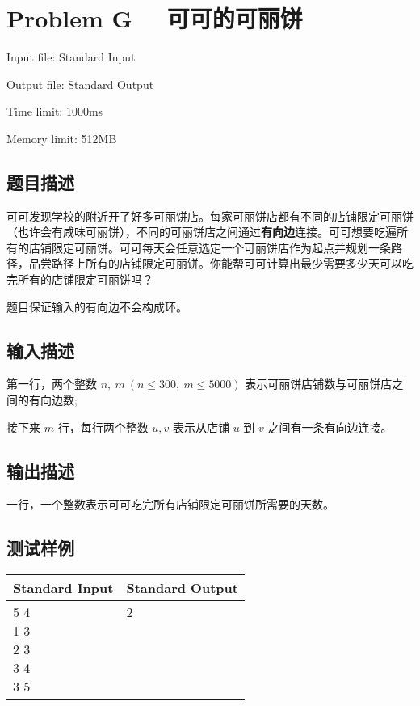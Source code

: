 \newpage
\section{Problem G \ \ 可可的可丽饼}
{ \limitfont{}
Input file: Standard Input \par
Output file: Standard Output \par
Time limit: 1000ms \par
Memory limit: 512MB \par
}
\subsection*{题目描述}
可可发现学校的附近开了好多可丽饼店。每家可丽饼店都有不同的店铺限定可丽饼（也许会有咸味可丽饼），不同的可丽饼店之间通过\textbf{有向边}连接。可可想要吃遍所有的店铺限定可丽饼。可可每天会任意选定一个可丽饼店作为起点并规划一条路径，品尝路径上所有的店铺限定可丽饼。你能帮可可计算出最少需要多少天可以吃完所有的店铺限定可丽饼吗？

题目保证输入的有向边不会构成环。
\subsection*{输入描述}

第一行，两个整数 $n,\ m \ (n \le 300,\ m \le 5000)$ 表示可丽饼店铺数与可丽饼店之间的有向边数;

接下来 $m$ 行，每行两个整数 $u, v$ 表示从店铺 $u$ 到 $v$ 之间有一条有向边连接。

\subsection*{输出描述}

一行，一个整数表示可可吃完所有店铺限定可丽饼所需要的天数。

\subsection*{测试样例}

\begin{table}[H]
\begin{tabularx}{\textwidth}{|X|X|}
    \hline
    \textbf{Standard Input} & \textbf{Standard Output} \\ 
    \hline 
    \tablecell{
        5 4 \\ 
        1 3 \\
        2 3 \\
        3 4 \\
        3 5 \\
    } & 
    \tablecell{
        2 \\ \\ \\ \\ \\
    } \\
    \hline
\end{tabularx}
\end{table}
